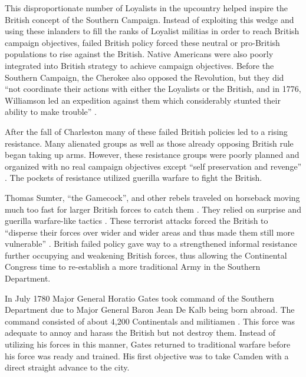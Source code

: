 This disproportionate number of Loyalists in the upcountry helped inspire the
British concept of the Southern Campaign.  Instead of exploiting this wedge and
using these inlanders to fill the ranks of Loyalist militias in order to reach
British campaign objectives, failed British policy forced these neutral or
pro-British populations to rise against the British.  Native Americans were also
poorly integrated into British strategy to achieve campaign objectives.  Before
the Southern Campaign, the Cherokee also opposed the Revolution, but they did
``not coordinate their actions with either the Loyalists or the British, and in
1776, Williamson led an expedition against them which considerably stunted their
ability to make trouble” \cite[p.12]{weigley_partisan_1970}.

After the fall of Charleston many of these failed British policies led to a
rising resistance.  Many alienated groups as well as those already opposing
British rule began taking up arms.  However, these resistance groups were poorly
planned and organized with no real campaign objectives except  “self
preservation and revenge” \cite[p.14]{weigley_partisan_1970}.  The pockets of resistance utilized
guerilla warfare to fight the British.  

Thomas Sumter, “the Gamecock”, and other rebels traveled on horseback moving
much too fast for larger British forces to catch them
\cite[p.15]{weigley_partisan_1970}.  They relied on surprise and guerilla
warfare-like tactics \cite[p.15]{weigley_partisan_1970}.  These terrorist
attacks forced the British to “disperse their forces over wider and wider areas
and thus made them still more vulnerable” \cite[p.16]{weigley_partisan_1970}.
British failed policy gave way to a strengthened informal resistance further
occupying and weakening British forces, thus allowing the Continental Congress
time to re-establish a more traditional Army in the Southern Department.

In July 1780 Major General Horatio Gates took command of the Southern Department
due to Major General Baron Jean De Kalb being born abroad.  The command
consisted of about 4,200 Continentals and militiamen \cite[p.21]{moncure_cowpens_1996}.  This
force was adequate to annoy and harass the British but not destroy them.
Instead of utilizing his forces in this manner, Gates returned to traditional
warfare before his force was ready and trained.  His first objective was to take
Camden with a direct straight advance to the city. 

